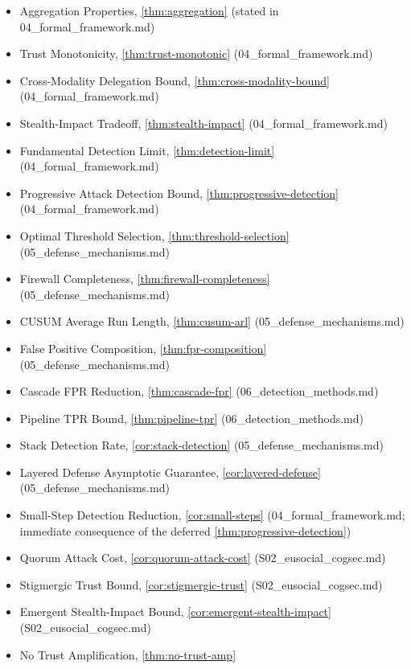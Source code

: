 \documentclass[
]{article}
\providecommand{\tightlist}{%
  \setlength{\itemsep}{0pt}\setlength{\parskip}{0pt}}
\begin{document}
\begin{itemize}
\tightlist
\item
  Aggregation Properties, \cref{thm:aggregation} (stated in
  04\_formal\_framework.md)
\item
  Trust Monotonicity, \cref{thm:trust-monotonic}
  (04\_formal\_framework.md)
\item
  Cross-Modality Delegation Bound, \cref{thm:cross-modality-bound}
  (04\_formal\_framework.md)
\item
  Stealth-Impact Tradeoff, \cref{thm:stealth-impact}
  (04\_formal\_framework.md)
\item
  Fundamental Detection Limit, \cref{thm:detection-limit}
  (04\_formal\_framework.md)
\item
  Progressive Attack Detection Bound, \cref{thm:progressive-detection}
  (04\_formal\_framework.md)
\item
  Optimal Threshold Selection, \cref{thm:threshold-selection}
  (05\_defense\_mechanisms.md)
\item
  Firewall Completeness, \cref{thm:firewall-completeness}
  (05\_defense\_mechanisms.md)
\item
  CUSUM Average Run Length, \cref{thm:cusum-arl}
  (05\_defense\_mechanisms.md)
\item
  False Positive Composition, \cref{thm:fpr-composition}
  (05\_defense\_mechanisms.md)
\item
  Cascade FPR Reduction, \cref{thm:cascade-fpr}
  (06\_detection\_methods.md)
\item
  Pipeline TPR Bound, \cref{thm:pipeline-tpr}
  (06\_detection\_methods.md)
\item
  Stack Detection Rate, \cref{cor:stack-detection}
  (05\_defense\_mechanisms.md)
\item
  Layered Defense Asymptotic Guarantee, \cref{cor:layered-defense}
  (05\_defense\_mechanisms.md)
\item
  Small-Step Detection Reduction, \cref{cor:small-steps}
  (04\_formal\_framework.md; immediate consequence of the deferred
  \cref{thm:progressive-detection})
\item
  Quorum Attack Cost, \cref{cor:quorum-attack-cost}
  (S02\_eusocial\_cogsec.md)
\item
  Stigmergic Trust Bound, \cref{cor:stigmergic-trust}
  (S02\_eusocial\_cogsec.md)
\item
  Emergent Stealth-Impact Bound, \cref{cor:emergent-stealth-impact}
  (S02\_eusocial\_cogsec.md)
\item
  No Trust Amplification, \cref{thm:no-trust-amp}

\end{itemize}
\end{document}
